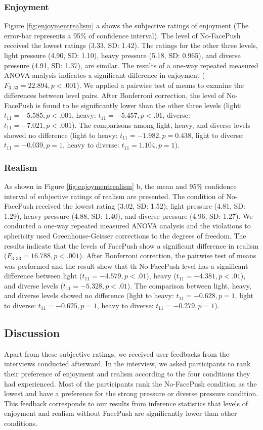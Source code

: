 \subsubsection{Enjoyment}
Figure \ref{fig:enjoymentrealism} a shows the subjective ratings of enjoyment (The error-bar represents a 95\% of confidence interval). The level of No-FacePush received the lowest ratings (3.33, SD: 1.42). The ratings for the other three levels, light pressure (4.90, SD: 1.10), heavy pressure (5.18, SD: 0.965), and diverse pressure (4.91, SD: 1.37), are similar. The results of a one-way repeated measured ANOVA analysis indicates a significant difference in enjoyment ($F_{3, 33} = 22.894, p < .001$). We applied a pairwise test of means to examine the differences between level pairs. After Bonferroni correction, the level of No-FacePush is found to be significantly lower than the other three levels (light: $t_{11} = -5.585, p < .001$, heavy: $t_{11} = -5.457, p < .01$, diverse: $t_{11} = -7.021, p < .001$). The comparisons among light, heavy, and diverse levels showed no difference (light to heavy: $t_{11} = -1.982, p = 0.438$, light to diverse: $t_{11} = -0.039, p = 1$, heavy to diverse: $t_{11} = 1.104, p = 1$).

\subsubsection{Realism}
As shown in Figure \ref{fig:enjoymentrealism} b, the mean and 95\% confidence interval of subjective ratings of realism are presented. The condition of No-FacePush received the lowest rating (3.02, SD: 1.52); light pressure (4.81, SD: 1.29), heavy pressure (4.88, SD: 1.40), and diverse pressure (4.96, SD: 1.27). We conducted a one-way repeated measured ANOVA analysis and the violations to sphericity used Greenhouse-Geisser corrections to the degrees of freedom. The results indicate that the levels of FacePush show a significant difference in realism ($F_{3, 33} = 16.788, p < .001$). After Bonferroni correction, the pairwise test of means was performed and the result show that th No-FacePush level has a significant difference between light ($t_{11} = -4.579, p < .01$), heavy ($t_{11} = -4.381, p < .01$), and diverse levels ($t_{11} = -5.328, p < .01$). The comparison between light, heavy, and diverse levels showed no difference (light to heavy: $t_{11} = -0.628, p = 1$, light to diverse: $t_{11} = -0.625, p = 1$, heavy to diverse: $t_{11} = -0.279, p = 1$).

\subsection{Discussion }
Apart from these subjective ratings, we received user feedbacks from the interviews conducted afterward. In the interview, we asked participants to rank their preference of enjoyment and realism according to the four conditions they had experienced. Most of the participants rank the No-FacePush condition as the lowest and have a preference for the strong pressure or diverse pressure condition. This feedback corresponds to our results from inference statistics that levels of enjoyment and realism without FacePush are significantly lower than other conditions.

